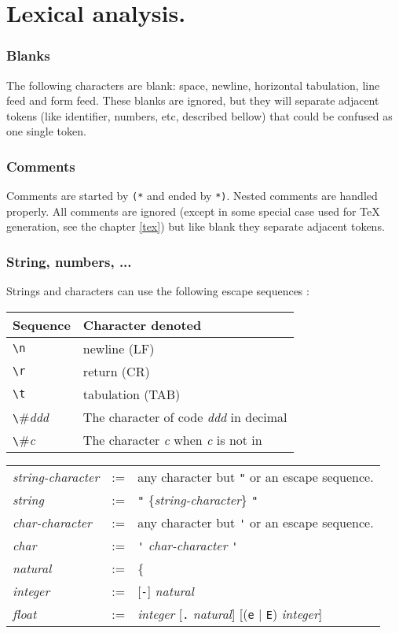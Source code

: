 \section{Lexical analysis.}

\subsubsection*{Blanks} The following characters are blank: space, newline,
  horizontal tabulation, line feed and form feed. These blanks are ignored, but
  they will separate adjacent tokens (like identifier, numbers, etc, described
  bellow) that could be confused as one single token. 

\subsubsection*{Comments} Comments are started by \verb#(*# and ended by 
\verb#*)#. Nested comments are handled properly. All comments are ignored
(except in some special case used for TeX generation, see the chapter
\ref{tex}) but like blank they separate adjacent tokens.

\subsubsection*{String, numbers, ...}

Strings and characters can use the following escape sequences :
\begin{center}
\begin{tabular}{|l|l|}
\hline
Sequence & Character denoted \\
\hline
\verb#\n# & newline (LF) \\
\verb#\r# & return (CR) \\
\verb#\t# & tabulation (TAB) \\
\verb#\#{\it ddd} & The character of code {\it ddd} in decimal  \\
\verb#\#{\it c} & The character {\it c} when {\it c} is not in \verb#0...9nbt# \\
\hline
\end{tabular} 
\end{center}

\begin{tabular}{lcl}
{\it string-character} &:=& any character but \verb#"# 
                            or an escape sequence.\\
{\it string} &:=& \verb#"# \{{\it string-character}\} \verb#"#\\
{\it char-character} &:=& any character but \verb#'# 
                          or an escape sequence.\\
{\it char} &:=& \verb#'# {\it char-character} \verb#'#\\
{\it natural} &:=& \{ \verb#0...9# \}$_+$\\
{\it integer} &:=& [\verb#-#] {\it natural}\\
{\it float} &:=& {\it integer} [\verb#.# {\it natural}] 
                             [(\verb#e# $|$ \verb#E#) {\it integer}]
\end{tabular}

